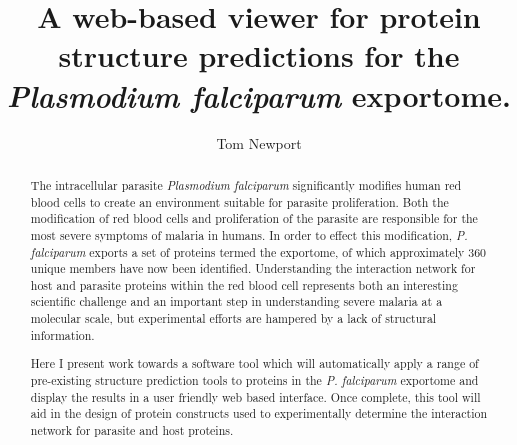 \documentclass[fleqn,10pt]{article} %
\begin{document}
\title{A web-based viewer for protein structure predictions for the \textit{Plasmodium falciparum} exportome.} %

\author{Tom Newport} %
\maketitle


\begin{abstract}

The intracellular parasite \textit{Plasmodium falciparum} significantly modifies human red blood cells to create an environment suitable for parasite proliferation. Both the modification of red blood cells and proliferation of the parasite are responsible for the most severe symptoms of malaria in humans. In order to effect this modification, \textit{P. falciparum} exports a set of proteins termed the exportome, of which approximately 360 unique members have now been identified. Understanding the interaction network for host and parasite proteins within the red blood cell represents both an interesting scientific challenge and an important step in understanding severe malaria at a molecular scale, but experimental efforts are hampered by a lack of structural information.

Here I present work towards a software tool which will automatically apply a range of pre-existing structure prediction tools to proteins in the \textit{P. falciparum} exportome and display the results in a user friendly web based interface. Once complete, this tool will aid in the design of protein constructs used to experimentally determine the interaction network for parasite and host proteins.

\end{abstract}

\maketitle %

\tableofcontents %

\thispagestyle{empty} %

\newcommand{\bn}
[1]{\textit{#1}}

\newcommand{\pf}
{\bn{P. falciparum }}

\newcommand{\str}
[1]{\textbf{#1}}
\end{document}
